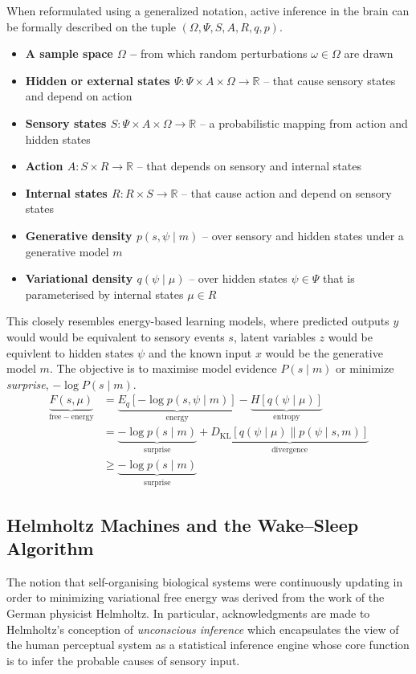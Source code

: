 \documentclass{article}
\begin{document}
When reformulated using a generalized notation, active inference in the brain can be formally described on the tuple $(\Omega ,\Psi ,S,A,R,q,p)$. 
\begin{itemize}
    \item \textbf{A sample space $\Omega$  –} from which random perturbations $\omega \in \Omega$  are drawn
    \item \textbf{Hidden or external states $\Psi:\Psi\times A \times \Omega \to \mathbb{R}$} – that cause sensory states and depend on action
    \item \textbf{Sensory states $S:\Psi \times A \times \Omega \to \mathbb{R}$} – a probabilistic mapping from action and hidden states
    \item \textbf{Action $A:S\times R \to \mathbb{R}$} – that depends on sensory and internal states
    \item \textbf{Internal states $R:R\times S \to \mathbb{R}$} – that cause action and depend on sensory states
    \item \textbf{Generative density $p(s,\psi \mid m)$} – over sensory and hidden states under a generative model $m$
    \item \textbf{Variational density $q(\psi \mid \mu )$} – over hidden states $\psi \in \Psi$ that is parameterised by internal states $\mu \in R$
\end{itemize}

This closely resembles energy-based learning models, where predicted outputs $y$ would would be equivalent to sensory events $s$, latent variables $z$ would be equivlent to hidden states $\psi$ and the known input $x$ would be the generative model $m$. The objective is to maximise model evidence $P(s\mid m)$ or minimize \textit{surprise}, $-\log P(s\mid m)$.
\begin{align*}
    \underset {\mathrm {free-energy} }{\underbrace {F(s,\mu )}} 
    &={\underset {\mathrm {energy} }{\underbrace {E_{q}[-\log p(s,\psi \mid m)]} }}-{\underset {\mathrm {entropy} }{\underbrace {H[q(\psi \mid \mu )]} }}\\
    &={\underset {\mathrm {surprise} }{\underbrace {-\log p(s\mid m)} }}+{\underset {\mathrm {divergence} }{\underbrace {D_{\mathrm {KL} }[q(\psi \mid \mu )\parallel p(\psi \mid s,m)]} }}\\
    &\geq {\underset {\mathrm {surprise} }{\underbrace {-\log p(s\mid m)} }}
\end{align*}


\subsection{Helmholtz Machines and the Wake--Sleep Algorithm}
The notion that self-organising biological systems were continuously updating in order to minimizing variational free energy was derived from the work of the German physicist Helmholtz. In particular, acknowledgments are made to Helmholtz's conception of \textit{unconscious inference} which encapsulates the view of the human perceptual system as a statistical inference engine whose core function is to infer the probable causes of sensory input.
\end{document}
